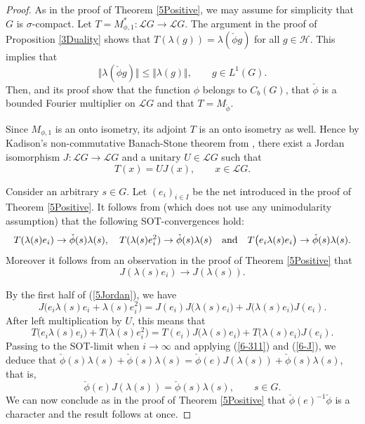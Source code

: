 \documentclass[12pt]{amsart}
\renewcommand{\H}{\mbox{${\mathcal H}$}}
\newcommand{\norm}[1]{\Vert#1\Vert}
\theoremstyle{remark}
\theoremstyle{definition}
\numberwithin{equation}{section}
\begin{document}
\begin{proof}
As in the proof of Theorem \ref{5Positive}, we may assume 
for simplicity that $G$ is $\sigma$-compact.
Let $T=M_{\phi,1}^*\colon {\mathcal L}G\to {\mathcal L}G$. The argument in the proof of 
Proposition \ref{3Duality} shows that
$T(\lambda(g))=\lambda(\check{\phi}g)$ for all $g\in\H$.
This implies that 
$$
\norm{\lambda(\check{\phi} g)}\leq \norm{\lambda(g)},\qquad g\in L^1(G).
$$
Then,  \cite[Proposition 1.2, (3)$\Rightarrow$(2)]{DCH} and its
proof show that
the function $\phi$ belongs to $C_b(G)$, that $\check{\phi}$ is a bounded
Fourier multiplier on ${\mathcal L}G$ and that $T=M_{\check{\phi}}$.

Since $M_{\phi,1}$  is an onto isometry, its adjoint
$T$ is an onto isometry as well. Hence by Kadison's non-commutative
Banach-Stone theorem from \cite{Kad}, 
there exist a Jordan 
isomorphism $J\colon {\mathcal L}G\to {\mathcal L}G$
and a unitary $U\in {\mathcal L}G$ such that 
$$
T(x) = UJ(x),\qquad x\in {\mathcal L}G.
$$



Consider an arbitrary $s\in G$.
Let $(e_i)_{i\in I}$ be the net introduced in the proof of Theorem 
\ref{5Positive}. 
It follows from \cite[Lemma 3.11]{AKLZ} (which does not use 
any unimodularity assumption) that the following SOT-convergences hold:
\begin{equation}\label{6-311}
T(\lambda(s)e_i)\to \check{\phi}(s)\lambda(s),\quad 
T(\lambda(s)e_i^2)\to \check{\phi}(s)\lambda(s)\quad\hbox{and}\quad
T\bigl(e_i\lambda(s)e_i\bigr) \to\check{\phi}(s)\lambda(s).
\end{equation}
Moreover it follows from an observation in the proof of  Theorem 
\ref{5Positive} that
\begin{equation}\label{6-J}
J(\lambda(s)e_i)\longrightarrow J(\lambda(s)).
\end{equation}


By the first half of (\ref{5Jordan}), we have 
$$
J\bigl(e_i\lambda(s)e_i + \lambda(s)e_i^2\bigr) 
=J(e_i)J\bigl(\lambda(s)e_i\bigr) + J\bigl(\lambda(s)e_i\bigr) J(e_i).
$$
After left multiplication by $U$, this means that
$$
T\bigl(e_i\lambda(s)e_i\bigr) +T\bigl(\lambda(s)e_i^2\bigr) 
=T(e_i)J\bigl(\lambda(s)e_i\bigr) + T\bigl(\lambda(s)e_i\bigr) J(e_i).
$$
Passing to the SOT-limit when $i\to \infty$ and applying (\ref{6-311}) and (\ref{6-J}), we deduce that 
$\check{\phi}(s)\lambda(s) +\check{\phi}(s)\lambda(s) =
\check{\phi}(e)J(\lambda(s)) + \check{\phi}(s)\lambda(s)$, that is,
$$
\check{\phi}(e) J(\lambda(s))=\check{\phi}(s)\lambda(s),\qquad s\in G.
$$
We can now conclude as in the proof of Theorem \ref{5Positive} that 
$\check{\phi}(e)^{-1}\check{\phi}$ is  a character and the result follows at once.
\end{proof}
\end{document}
